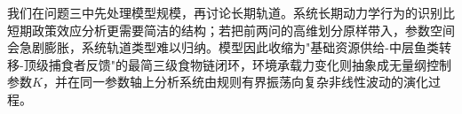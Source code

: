 我们在问题三中先处理模型规模，再讨论长期轨道。系统长期动力学行为的识别比短期政策效应分析更需要简洁的结构；若把前两问的高维划分原样带入，参数空间会急剧膨胀，系统轨道类型难以归纳。模型因此收缩为"基础资源供给-中层鱼类转移-顶级捕食者反馈"的最简三级食物链闭环，环境承载力变化则抽象成无量纲控制参数$K$，并在同一参数轴上分析系统由规则有界振荡向复杂非线性波动的演化过程。